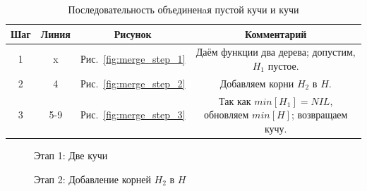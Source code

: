\documentclass[a4paper,10pt]{article}
\begin{document}
        \begin{table}[h!]
            \caption{Последовательность объединенaя пустой кучи и кучи}
			\center
            \begin{tabular}{|c|c|c|c|}
                \hline
                Шаг  & Линия &  Рисунок                     & Комментарий                 \\ \hline
                  1  &   x   &  Рис.~\ref{fig:merge_step_1} & Даём функции два дерева; допустим, $H_1$ пустое.    \\ \hline
                  2  &   4   &  Рис.~\ref{fig:merge_step_2} & Добавляем корни $H_2$ в $H$. \\ \hline
                  3  &  5-9  &  Рис.~\ref{fig:merge_step_3} & Так как $min[H_1] = NIL$, обновляем $min[H]$; возвращаем кучу. \\ \hline
            \end{tabular}
        \end{table}

        \begin{figure}[h!]
            \caption{Этап 1: Две кучи}
            \label{fig:merge_step_11}
            \center
        \end{figure}

        \begin{figure}[h!]
            \caption{Этап 2: Добавление корней $H_2$ в $H$}
            \label{fig:merge_step_21}
            \center
        \end{figure}
\end{document}
